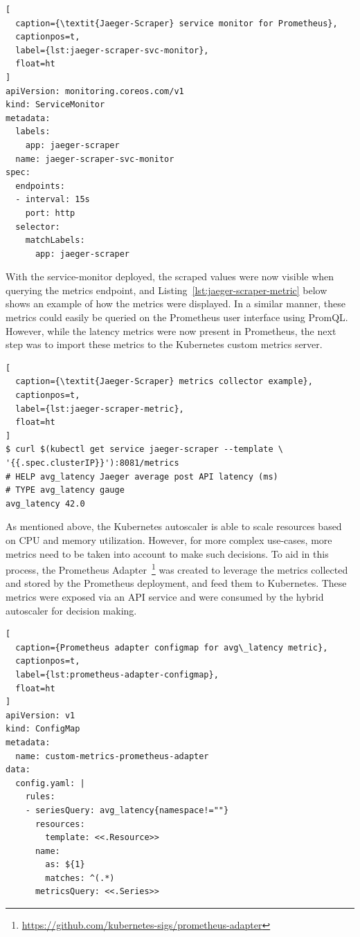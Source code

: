 \begin{lstlisting}[
  caption={\textit{Jaeger-Scraper} service monitor for Prometheus},
  captionpos=t,
  label={lst:jaeger-scraper-svc-monitor},
  float=ht
]
apiVersion: monitoring.coreos.com/v1
kind: ServiceMonitor
metadata:
  labels:
    app: jaeger-scraper
  name: jaeger-scraper-svc-monitor
spec:
  endpoints:
  - interval: 15s
    port: http
  selector:
    matchLabels:
      app: jaeger-scraper
\end{lstlisting}

With the service-monitor deployed, the scraped values were now visible when querying the metrics endpoint, and Listing~\ref{lst:jaeger-scraper-metric} below shows an example of how the metrics were displayed. In a similar manner, these metrics could easily be queried on the Prometheus user interface using PromQL. However, while the latency metrics were now present in Prometheus, the next step was to import these metrics to the Kubernetes custom metrics server.\par

\begin{lstlisting}[
  caption={\textit{Jaeger-Scraper} metrics collector example},
  captionpos=t,
  label={lst:jaeger-scraper-metric},
  float=ht
]
$ curl $(kubectl get service jaeger-scraper --template \
'{{.spec.clusterIP}}'):8081/metrics
# HELP avg_latency Jaeger average post API latency (ms)
# TYPE avg_latency gauge
avg_latency 42.0
\end{lstlisting}

As mentioned above, the Kubernetes autoscaler is able to scale resources based on CPU and memory utilization. However, for more complex use-cases, more metrics need to be taken into account to make such decisions. To aid in this process, the Prometheus Adapter~\footnote{\url{https://github.com/kubernetes-sigs/prometheus-adapter}} was created to leverage the metrics collected and stored by the Prometheus deployment, and feed them to Kubernetes. These metrics were exposed via an API service and were consumed by the hybrid autoscaler for decision making.\par

\begin{lstlisting}[
  caption={Prometheus adapter configmap for avg\_latency metric},
  captionpos=t,
  label={lst:prometheus-adapter-configmap},
  float=ht
]
apiVersion: v1
kind: ConfigMap
metadata:
  name: custom-metrics-prometheus-adapter
data:
  config.yaml: |
    rules:
    - seriesQuery: avg_latency{namespace!=""}
      resources:
        template: <<.Resource>>
      name:
        as: ${1}
        matches: ^(.*)
      metricsQuery: <<.Series>>
\end{lstlisting}

